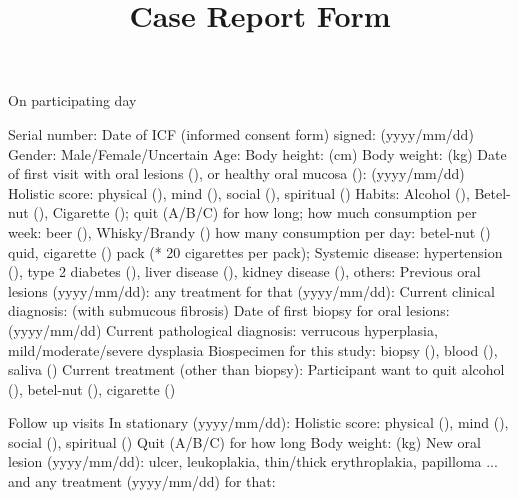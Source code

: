 \documentclass{article}
\title{Case Report Form}
\date{} %
\begin{document}
\maketitle
\thispagestyle{fancy} 


\begin{outline}

\0 On participating day

\1 Serial number:
\1 Date of ICF (informed consent form) signed: (yyyy/mm/dd)
\1 Gender: Male/Female/Uncertain
\1 Age:
\1 Body height: (cm)
\1 Body weight: (kg)
\1 Date of first visit with oral lesions (), or healthy oral mucosa (): (yyyy/mm/dd)
    \2 Holistic score: physical (), mind (), social (), spiritual ()
    \2 Habits: Alcohol (), Betel-nut (), Cigarette ();
        \3 quit (A/B/C) for how long;
        \3 how much consumption per week: beer (), Whisky/Brandy ()
        \3 how many consumption per day: betel-nut () quid, cigarette () pack {\footnotesize (* 20 cigarettes per pack)};
\1 Systemic disease: hypertension (), type 2 diabetes (), liver disease (), kidney disease (), others:
\1 Previous oral lesions (yyyy/mm/dd):
    \2 any treatment for that (yyyy/mm/dd):
\1 Current clinical diagnosis: (with submucous fibrosis)
\1 Date of first biopsy for oral lesions: (yyyy/mm/dd)
\1 Current pathological diagnosis: verrucous hyperplasia, mild/moderate/severe dysplasia
    \1 Biospecimen for this study: biopsy (), blood (), saliva ()
\1 Current treatment (other than biopsy):
\1 Participant want to quit alcohol (), betel-nut (), cigarette ()

\vspace{10mm}

\0 Follow up visits
\1 In stationary (yyyy/mm/dd):
    \2 Holistic score: physical (), mind (), social (), spiritual ()
    \2 Quit (A/B/C) for how long
    \2 Body weight: (kg)
    \2 New oral lesion (yyyy/mm/dd): ulcer, leukoplakia, thin/thick erythroplakia, papilloma 
    \3 ... and any treatment (yyyy/mm/dd) for that:

\vspace{10mm}



\end{outline}
\end{document}
